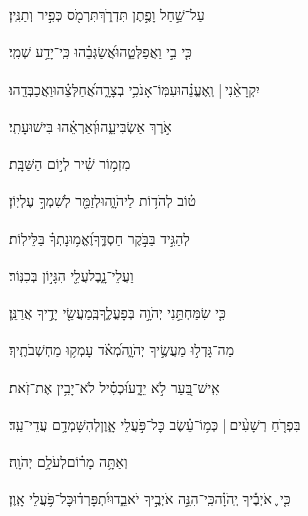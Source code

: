 \documentclass[12pt]{article}
\newcommand{\loc}[1]{\textsuperscript{\locf{#1}}}
\begin{document}
{\loc{ יג}~}‏עַל־שַׁ֣חַל וָפֶ֣תֶן תִּדְרֹ֑ךְ{\hfill}תִּרְמֹ֖ס כְּפִ֣יר וְתַנִּֽין׃\par

{\loc{ יד}~}‏כִּ֤י בִ֣י  וַאֲפַלְּטֵ֑הוּ{\hfill}אֲ֝שַׂגְּבֵ֗הוּ כִּֽי־יָדַ֥ע שְׁמִֽי׃\par

{\loc{ טו}~}‏יִקְרָאֵ֨נִי |  וְֽאֶעֱנֵ֗הוּ{\hfill}עִמּֽוֹ־אָנֹכִ֥י בְצָרָ֑ה\newline\hspace*{.5em}אֲ֝חַלְּצֵ֗הוּ{\hfill}וַאֲכַבְּדֵֽהוּ׃\par

{\loc{ טז}~}‏אֹ֣רֶךְ  אַשְׂבִּיעֵ֑הוּ{\hfill}וְ֝אַרְאֵ֗הוּ בִּישׁוּעָתִֽי׃\par\pend
\ledpb
\pstart[\subsection*{\textcolor{red}{פרק צב}}]\label{פרק צב}
{\loc{ א}~}‏מִזְמ֥וֹר שִׁ֗יר לְי֣וֹם הַשַּׁבָּֽת׃\par

{\loc{ ב}~}‏ט֗וֹב לְהֹד֥וֹת לַיהֹוָ֑ה{\hfill}וּלְזַמֵּ֖ר לְשִׁמְךָ֣ עֶלְיֽוֹן׃\par

{\loc{ ג}~}‏לְהַגִּ֣יד בַּבֹּ֣קֶר חַסְדֶּ֑ךָ{\hfill}וֶ֝אֱמ֥וּנָתְךָ֗ בַּלֵּילֽוֹת׃\par

{\loc{ ד}~}‏ וַעֲלֵי־נָ֑בֶל{\hfill}עֲלֵ֖י הִגָּי֣וֹן בְּכִנּֽוֹר׃\par

{\loc{ ה}~}‏כִּ֤י שִׂמַּחְתַּ֣נִי יְהֹוָ֣ה בְּפָעֳלֶ֑ךָ{\hfill}בְּֽמַעֲשֵׂ֖י יָדֶ֣יךָ אֲרַנֵּֽן׃\par

{\loc{ ו}~}‏מַה־גָּדְל֣וּ מַעֲשֶׂ֣יךָ יְהֹוָ֑ה{\hfill}מְ֝אֹ֗ד עָמְק֥וּ מַחְשְׁבֹתֶֽיךָ׃\par

{\loc{ ז}~}‏אִֽישׁ־בַּ֭עַר לֹ֣א יֵדָ֑ע{\hfill}וּ֝כְסִ֗יל לֹא־יָבִ֥ין אֶת־זֹֽאת׃\par

{\loc{ ח}~}‏בִּפְרֹ֤חַ רְשָׁעִ֨ים | {\hfill}כְּמ֥וֹ־עֵ֗שֶׂב\newline\hspace*{.5em} כׇּל־פֹּ֣עֲלֵי אָ֑וֶן{\hfill}לְהִשָּׁמְדָ֥ם עֲדֵי־עַֽד׃\par

{\loc{ ט}~}‏וְאַתָּ֥ה מָר֗וֹם{\hfill}לְעֹלָ֥ם יְהֹוָֽה׃\par

{\loc{ י}~}‏כִּ֤י ֪ אֹיְבֶ֡יךָ יְֽהֹוָ֗ה{\hfill}כִּֽי־הִנֵּ֣ה אֹיְבֶ֣יךָ יֹאבֵ֑דוּ\newline\hspace*{.5em}יִ֝תְפָּרְד֗וּ{\hfill}כׇּל־פֹּ֥עֲלֵי אָֽוֶן׃\par
\end{document}
